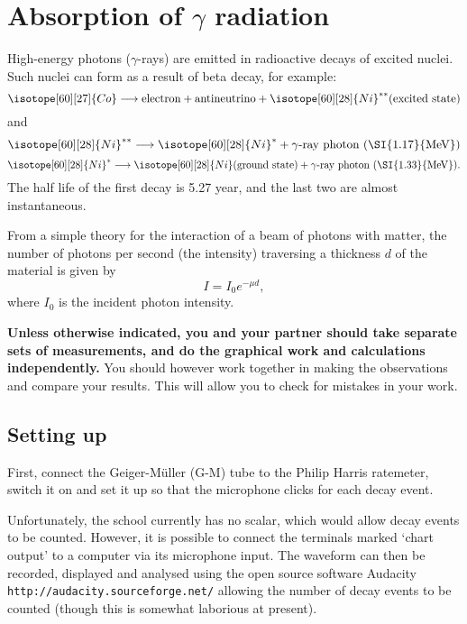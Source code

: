 \section{Absorption of $\gamma$ radiation}
\label{gamma}

High-energy photons ($\gamma$-rays) are emitted in radioactive decays of excited nuclei.  Such nuclei can form as a result of beta decay, for example:
\[\isotope[60][27]{Co}\longrightarrow\text{electron}+\text{antineutrino}+\isotope[60][28]{Ni}^{**}\text{(excited state)}\]
and
\[\isotope[60][28]{Ni}^{**}\longrightarrow\isotope[60][28]{Ni}^{*}+\gamma\text{-ray photon (\SI{1.17}{MeV})}\]
\[\isotope[60][28]{Ni}^{*}\longrightarrow\isotope[60][28]{Ni}\text{(ground state)}+\gamma\text{-ray photon (\SI{1.33}{MeV})}.\]
The half life of the first decay is 5.27 year, and the last two are almost instantaneous.

From a simple theory for the interaction of a beam of photons with matter, the number of photons per second (the intensity) traversing a thickness $d$ of the material is given by
\[I=I_{0}e^{-\mu d},\]
where $I_{0}$ is the incident photon intensity.

{\bf Unless otherwise indicated, you and your partner should take separate sets of measurements, and do the graphical work and calculations independently.}  You should however work together in making the observations and compare your results.  This will allow you to check for mistakes in your work.

\subsection{Setting up}

First, connect the Geiger-M\"{u}ller (G-M) tube to the Philip Harris ratemeter, switch it on and set it up so that the microphone clicks for each decay event.

Unfortunately, the school currently has no scalar, which would allow decay events to be counted.  However, it is possible to connect the terminals marked `chart output' to a computer via its microphone input.  The waveform can then be recorded, displayed and analysed using the open source software Audacity \texttt{http://audacity.sourceforge.net/} allowing the number of decay events to be counted (though this is somewhat laborious at present).

